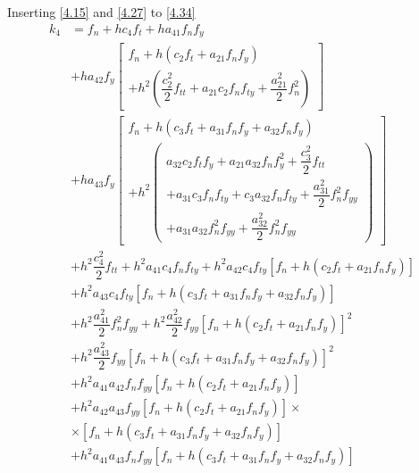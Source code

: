 \documentclass[a4paper,oneside]{book}
\numberwithin{equation}{chapter}
\begin{document}
Inserting \eqref{4.15} and \eqref{4.27} to \eqref{4.34}
\begin{align}
{k_4} &= {f_n} + h{c_4}{f_t} + h{a_{41}}{f_n}{f_y}\\
 &  + h{a_{42}}{f_y}\left[ \begin{array}{l}
{f_n} + h\left( {{c_2}{f_t} + {a_{21}}{f_n}{f_y}} \right)\\
 + {h^2}\left( {\dfrac{{c_2^2}}{2}{f_{tt}} + {a_{21}}{c_2}{f_n}{f_{ty}} + \dfrac{{a_{21}^2}}{2}f_n^2} \right)
\end{array} \right]\\
 &+ h{a_{43}}{f_y}\left[ \begin{array}{l}
{f_n} + h\left( {{c_3}{f_t} + {a_{31}}{f_n}{f_y} + {a_{32}}{f_n}{f_y}} \right)\\
 + {h^2}\left( \begin{array}{l}
{a_{32}}{c_2}{f_t}{f_y} + {a_{21}}{a_{32}}{f_n}f_y^2 + \dfrac{{c_3^2}}{2}{f_{tt}} \\+ {a_{31}}{c_3}{f_n}{f_{ty}}
 + {c_3}{a_{32}}{f_n}{f_{ty}} + \dfrac{{a_{31}^2}}{2}f_n^2{f_{yy}}\\ + {a_{31}}{a_{32}}f_n^2{f_{yy}} + \dfrac{{a_{32}^2}}{2}f_n^2{f_{yy}}
\end{array} \right)
\end{array} \right]\\
 &+ {h^2}\dfrac{{c_4^2}}{2}{f_{tt}} + {h^2}{a_{41}}{c_4}{f_n}{f_{ty}} + {h^2}{a_{42}}{c_4}{f_{ty}}\left[ {{f_n} + h\left( {{c_2}{f_t} + {a_{21}}{f_n}{f_y}} \right)} \right]\\
 &+ {h^2}{a_{43}}{c_4}{f_{ty}}\left[ {{f_n} + h\left( {{c_3}{f_t} + {a_{31}}{f_n}{f_y} + {a_{32}}{f_n}{f_y}} \right)} \right] \\
 &+ {h^2}\dfrac{{a_{41}^2}}{2}f_n^2{f_{yy}} + {h^2}\dfrac{{a_{42}^2}}{2}{f_{yy}}{\left[ {{f_n} + h\left( {{c_2}{f_t} + {a_{21}}{f_n}{f_y}} \right)} \right]^2}\\
 &+ {h^2}\dfrac{{a_{43}^2}}{2}{f_{yy}}{\left[ {{f_n} + h\left( {{c_3}{f_t} + {a_{31}}{f_n}{f_y} + {a_{32}}{f_n}{f_y}} \right)} \right]^2}\\
&+ {h^2}{a_{41}}{a_{42}}{f_n}{f_{yy}}\left[ {{f_n} + h\left( {{c_2}{f_t} + {a_{21}}{f_n}{f_y}} \right)} \right]\\
 &+ {h^2}{a_{42}}{a_{43}}{f_{yy}}\left[ {{f_n} + h\left( {{c_2}{f_t} + {a_{21}}{f_n}{f_y}} \right)} \right] \times \\
& \times \left[ {{f_n} + h\left( {{c_3}{f_t} + {a_{31}}{f_n}{f_y} + {a_{32}}{f_n}{f_y}} \right)} \right]\\
 &+ {h^2}{a_{41}}{a_{43}}{f_n}{f_{yy}}\left[ {{f_n} + h\left( {{c_3}{f_t} + {a_{31}}{f_n}{f_y} + {a_{32}}{f_n}{f_y}} \right)} \right]\\

\end{align}
\end{document}
